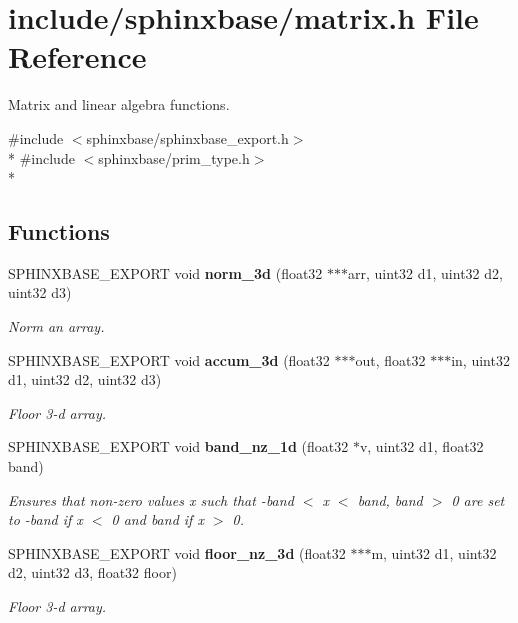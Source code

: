 \section{include/sphinxbase/matrix.h File Reference}
\label{matrix_8h}


Matrix and linear algebra functions.  


{\ttfamily \#include $<$sphinxbase/sphinxbase\+\_\+export.\+h$>$}\\*
{\ttfamily \#include $<$sphinxbase/prim\+\_\+type.\+h$>$}\\*
\subsection*{Functions}
\begin{DoxyCompactItemize}
\item 
S\+P\+H\+I\+N\+X\+B\+A\+S\+E\+\_\+\+E\+X\+P\+O\+R\+T void {\bf norm\+\_\+3d} (float32 $\ast$$\ast$$\ast$arr, uint32 d1, uint32 d2, uint32 d3)
\begin{DoxyCompactList}\small\item\em Norm an array. \end{DoxyCompactList}\item 
S\+P\+H\+I\+N\+X\+B\+A\+S\+E\+\_\+\+E\+X\+P\+O\+R\+T void {\bf accum\+\_\+3d} (float32 $\ast$$\ast$$\ast$out, float32 $\ast$$\ast$$\ast$in, uint32 d1, uint32 d2, uint32 d3)
\begin{DoxyCompactList}\small\item\em Floor 3-\/d array. \end{DoxyCompactList}\item 
S\+P\+H\+I\+N\+X\+B\+A\+S\+E\+\_\+\+E\+X\+P\+O\+R\+T void {\bf band\+\_\+nz\+\_\+1d} (float32 $\ast$v, uint32 d1, float32 band)
\begin{DoxyCompactList}\small\item\em Ensures that non-\/zero values x such that -\/band $<$ x $<$ band, band $>$ 0 are set to -\/band if x $<$ 0 and band if x $>$ 0. \end{DoxyCompactList}\item 
S\+P\+H\+I\+N\+X\+B\+A\+S\+E\+\_\+\+E\+X\+P\+O\+R\+T void {\bf floor\+\_\+nz\+\_\+3d} (float32 $\ast$$\ast$$\ast$m, uint32 d1, uint32 d2, uint32 d3, float32 floor)
\begin{DoxyCompactList}\small\item\em Floor 3-\/d array. \end{DoxyCompactList}\item 

\end{DoxyCompactItemize}
